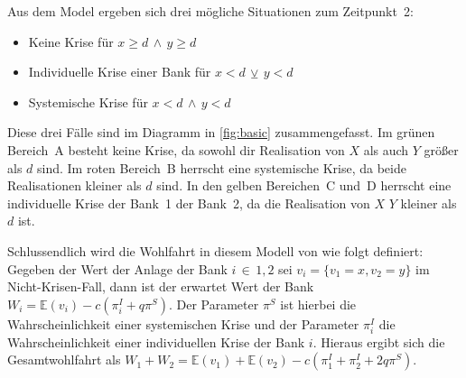 Aus dem Model ergeben sich drei mögliche Situationen zum Zeitpunkt~2:

\begin{itemize}
	\item Keine Krise für $x \geq d \,\wedge\, y \geq d$
	\item Individuelle Krise einer Bank für $x < d \,\veebar\, y < d$
	\item Systemische Krise für $x < d \,\wedge\, y < d$
\end{itemize}

Diese drei Fälle sind im Diagramm in \cref{fig:basic} zusammengefasst. Im grünen Bereich~A besteht keine Krise, da sowohl dir Realisation von $X$ als auch $Y$ größer als $d$ sind. Im roten Bereich~B herrscht eine systemische Krise, da beide Realisationen kleiner als $d$ sind. In den gelben Bereichen~C und~D herrscht eine individuelle Krise der Bank~1 \bzw{} der Bank~2, da die Realisation von $X$ \bzw{} $Y$ kleiner als $d$ ist.

Schlussendlich wird die Wohlfahrt in diesem Modell von \citeauthor{Wagner-2010} wie folgt definiert: Gegeben der Wert der Anlage der Bank $i \,\in\, {1,2}$ sei $v_i=\{v_1=x, v_2=y\}$ im Nicht-Krisen-Fall, dann ist der erwartet Wert der Bank $W_i = \mathbb{E}(v_i) - c(\pi^I_i + q\pi^S)$. Der Parameter $\pi^S$ ist hierbei die Wahrscheinlichkeit einer systemischen Krise und der Parameter $\pi^I_i$ die Wahrscheinlichkeit einer individuellen Krise der Bank $i$. Hieraus ergibt sich die Gesamtwohlfahrt als $W_1 + W_2 = \mathbb{E}(v_1) + \mathbb{E}(v_2) - c(\pi^I_1 + \pi^I_2 + 2q\pi^S)$.
